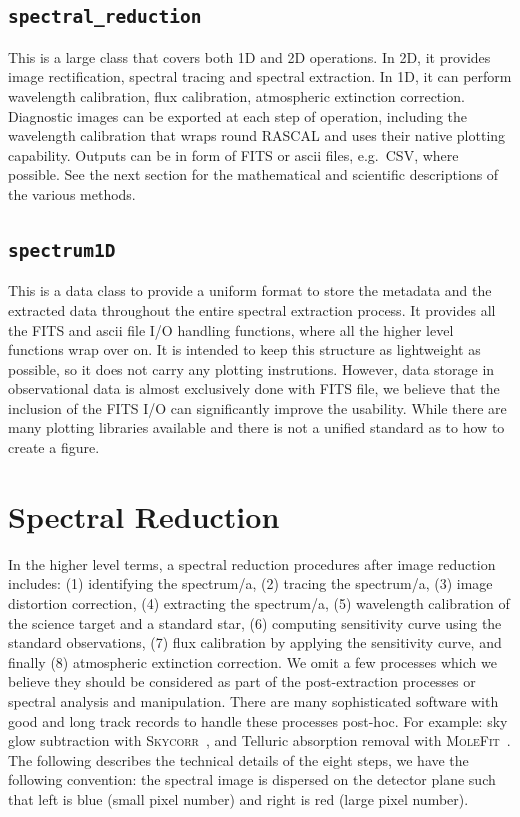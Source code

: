 \documentclass[fleqn,usenatbib]{mnras}
\begin{document}
\subsection*{\texttt{spectral\_reduction}}
This is a large class that covers both 1D and 2D operations. In 2D, it
provides image rectification, spectral tracing and spectral extraction.
In 1D, it can perform wavelength calibration, flux calibration, atmospheric
extinction correction. Diagnostic images can be exported at each step
of operation, including the wavelength calibration that wraps round
\textsc{RASCAL} and uses their native plotting capability. Outputs can
be in form of FITS or ascii files, e.g.\ CSV, where possible. See the next
section for the mathematical and scientific descriptions of the various
methods.

\subsection*{\texttt{spectrum1D}}
This is a data class to provide a uniform format to store the metadata
and the extracted data throughout the entire spectral extraction process.
It provides all the FITS and ascii file I/O handling functions, where all
the higher level functions wrap over on. It is intended to keep this
structure as lightweight as possible, so it does not carry any plotting
instrutions. However, data storage in observational data is almost
exclusively done with FITS file, we believe that the inclusion of the
FITS I/O can significantly improve the usability. While there are many
plotting libraries available and there is not a unified standard
as to how to create a figure.

\section{Spectral Reduction}
In the higher level terms, a spectral reduction procedures after image
reduction includes: (1) identifying the spectrum/a, (2) tracing the
spectrum/a, (3) image distortion correction, (4) extracting the
spectrum/a, (5) wavelength calibration of the science target and a
standard star, (6) computing sensitivity curve using the standard
observations, (7) flux calibration by applying the sensitivity curve,
and finally (8) atmospheric extinction correction. We omit a few
processes which we believe they should be considered as part of the
post-extraction processes or spectral analysis and manipulation.
There are many sophisticated software with good and long track records
to handle these processes post-hoc. For example: sky glow subtraction
with \textsc{Skycorr}~\citep{2014A&A...567A..25N}, and Telluric
absorption removal with
\textsc{MoleFit}~\citep{2015A&A...576A..77S, 2015A&A...576A..78K}.
The following describes the technical details of the eight steps,
we have the following convention: the spectral image is dispersed
on the detector plane such that left is blue (small pixel number)
and right is red (large pixel number).
\end{document}
